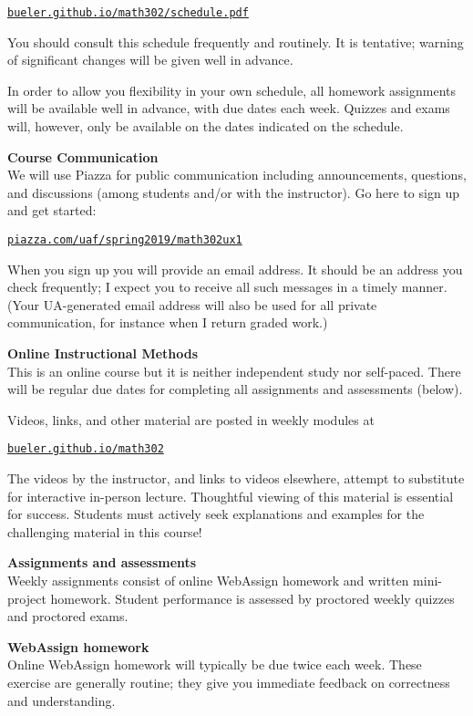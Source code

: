 \documentclass[12pt]{article}
\renewcommand{\emph}[1]{\textsf{\textbf{#1}}}
\newcommand{\localhead}[1]{\par\smallskip\textbf{#1}\nobreak\\}%
\def\heading#1{\localhead{\large\emph{#1}}}
\def\subheading#1{\localhead{\emph{#1}}}
\begin{document}
\smallskip
\centerline{\href{https://bueler.github.io/math302/schedule.pdf}{\tt bueler.github.io/math302/schedule.pdf}}

You should consult this schedule frequently and routinely.  It is tentative; warning of significant changes will be given well in advance.

In order to allow you flexibility in your own schedule, all homework assignments will be available well in advance, with due dates each week.  Quizzes and exams will, however, only be available on the dates indicated on the schedule.


\heading{Course Communication}
We will use Piazza for public communication including announcements, questions, and discussions (among students and/or with the instructor).  Go here to sign up and get started:

\smallskip
\centerline{\href{https://piazza.com/uaf/spring2019/math302ux1}{\tt piazza.com/uaf/spring2019/math302ux1}}

When you sign up you will provide an email address.  It should be an address you check frequently; I expect you to receive all such messages in a timely manner.  (Your UA-generated email address will also be used for all private communication, for instance when I return graded work.)


\newpage
\strut

\heading{Online Instructional Methods}
This is an online course but it is neither independent study nor self-paced.  There will be regular due dates for completing all assignments and assessments (below).

Videos, links, and other material are posted in weekly modules at

\smallskip
\centerline{\href{https://bueler.github.io/math302/}{\tt bueler.github.io/math302}}

The videos by the instructor, and links to videos elsewhere, attempt to substitute for interactive in-person lecture.  Thoughtful viewing of this material is essential for success.  Students must actively seek explanations and examples for the challenging material in this course!


\heading{Assignments and assessments}
Weekly assignments consist of online WebAssign homework and written mini-project homework.  Student performance is assessed by proctored weekly quizzes and proctored exams.

\subheading{WebAssign homework} 
Online WebAssign homework will typically be due twice each week.  These exercise are generally routine; they give you immediate feedback on correctness and understanding.
\end{document}
